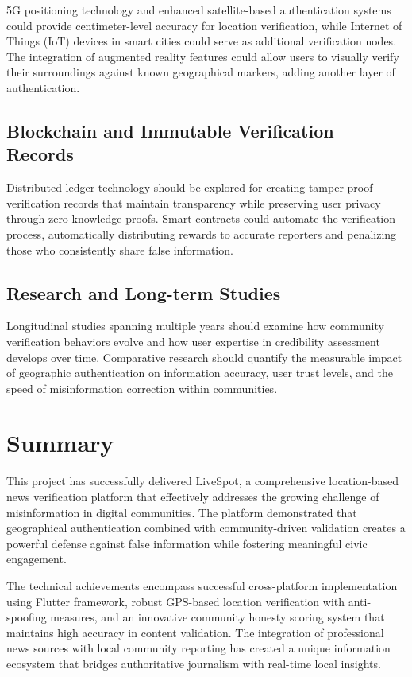 5G positioning technology and enhanced satellite-based authentication systems could provide centimeter-level accuracy for location verification, while Internet of Things (IoT) devices in smart cities could serve as additional verification nodes. The integration of augmented reality features could allow users to visually verify their surroundings against known geographical markers, adding another layer of authentication.

\subsection{Blockchain and Immutable Verification Records}
\label{subsec:blockchain_integration}

Distributed ledger technology should be explored for creating tamper-proof verification records that maintain transparency while preserving user privacy through zero-knowledge proofs. Smart contracts could automate the verification process, automatically distributing rewards to accurate reporters and penalizing those who consistently share false information.

\subsection{Research and Long-term Studies}
\label{subsec:research_directions}

Longitudinal studies spanning multiple years should examine how community verification behaviors evolve and how user expertise in credibility assessment develops over time. Comparative research should quantify the measurable impact of geographic authentication on information accuracy, user trust levels, and the speed of misinformation correction within communities.
\clearpage
\section{Summary}
\label{sec:conclusions_summary}

This project has successfully delivered LiveSpot, a comprehensive location-based news verification platform that effectively addresses the growing challenge of misinformation in digital communities. The platform demonstrated that geographical authentication combined with community-driven validation creates a powerful defense against false information while fostering meaningful civic engagement.

The technical achievements encompass successful cross-platform implementation using Flutter framework, robust GPS-based location verification with anti-spoofing measures, and an innovative community honesty scoring system that maintains high accuracy in content validation. The integration of professional news sources with local community reporting has created a unique information ecosystem that bridges authoritative journalism with real-time local insights.

